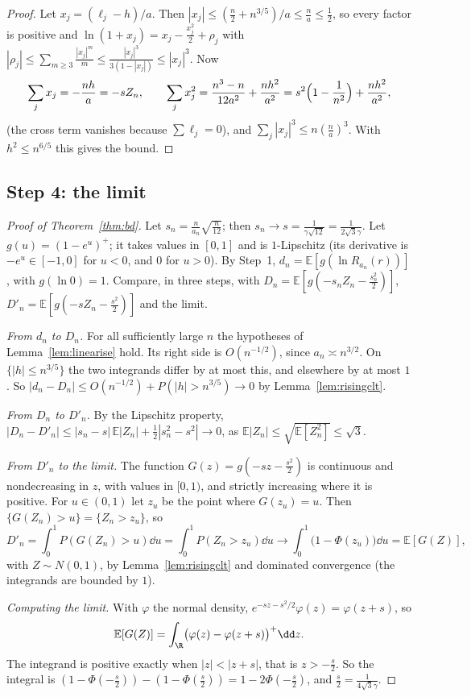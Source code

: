 \begin{proof}
Let $x_j=(\ell_j-h)/a$. Then $|x_j|\le(\frac n2+n^{3/5})/a\le\frac na\le\frac12$, so every factor is positive and $\ln(1+x_j)=x_j-\frac{x_j^2}2+\rho_j$ with
$|\rho_j|\le\sum_{m\ge3}\frac{|x_j|^m}m\le\frac{|x_j|^3}{3(1-|x_j|)}\le|x_j|^3$. Now
\[
\sum_jx_j=-\frac{nh}a=-sZ_n,\qquad\sum_jx_j^2=\frac{n^3-n}{12a^2}+\frac{nh^2}{a^2}=s^2\Bigl(1-\frac1{n^2}\Bigr)+\frac{nh^2}{a^2},
\]
(the cross term vanishes because $\sum\ell_j=0$), and $\sum_j|x_j|^3\le n(\frac na)^3$. With $h^2\le n^{6/5}$ this gives the bound.
\end{proof}

\subsection*{Step 4: the limit}

\begin{proof}[Proof of Theorem~\ref{thm:bd}]
Let $s_n=\frac n{a_n}\sqrt{\frac n{12}}$; then $s_n\to s=\frac1{\gamma\sqrt{12}}=\frac1{2\sqrt3\gamma}$. Let $g(u)=(1-e^u)^+$; it takes values in $[0,1]$ and is $1$-Lipschitz (its derivative is $-e^u\in[-1,0]$ for $u<0$,
and $0$ for $u>0$). By Step~1, $d_n=\mathbb E[g(\ln R_{a_n}(r))]$, with $g(\ln0)=1$. Compare, in three steps, with $D_n=\mathbb E[g(-s_nZ_n-\frac{s_n^2}2)]$, $D'_n=\mathbb E[g(-sZ_n-\frac{s^2}2)]$ and the
limit.

\emph{From $d_n$ to $D_n$.} For all sufficiently large $n$ the hypotheses of Lemma~\ref{lem:linearise} hold. Its right side is $O(n^{-1/2})$, since $a_n\asymp n^{3/2}$. On $\{|h|\le n^{3/5}\}$ the two integrands differ by at most this, and
elsewhere by at most $1$. So $|d_n-D_n|\le O(n^{-1/2})+P(|h|>n^{3/5})\to0$ by Lemma~\ref{lem:risingclt}.

\emph{From $D_n$ to $D'_n$.} By the Lipschitz property, $|D_n-D'_n|\le|s_n-s|\,\mathbb E|Z_n|+\frac12|s_n^2-s^2|\to0$, as $\mathbb E|Z_n|\le\sqrt{\mathbb E[Z_n^2]}\le\sqrt3$.

\emph{From $D'_n$ to the limit.} The function $G(z)=g(-sz-\frac{s^2}2)$ is continuous and nondecreasing in $z$, with values in $[0,1)$, and strictly increasing where it is positive.
For $u\in(0,1)$ let $z_u$ be the point where $G(z_u)=u$. Then $\{G(Z_n)>u\}=\{Z_n>z_u\}$, so
\[
D'_n=\int_0^1P(G(Z_n)>u)\dd u=\int_0^1P(Z_n>z_u)\dd u\longrightarrow\int_0^1\bigl(1-\Phi(z_u)\bigr)\dd u=\mathbb E[G(Z)],
\]
with $Z\sim N(0,1)$, by Lemma~\ref{lem:risingclt} and dominated convergence (the integrands are bounded by $1$).

\emph{Computing the limit.} With $\varphi$ the normal density, $e^{-sz-s^2/2}\varphi(z)=\varphi(z+s)$, so
\[
\mathbb E[G(Z)]=\int_\R\bigl(\varphi(z)-\varphi(z+s)\bigr)^+\dd z.
\]
The integrand is positive exactly when $|z|<|z+s|$, that is $z>-\frac s2$. So the integral is $(1-\Phi(-\frac s2))-(1-\Phi(\frac s2))=1-2\Phi(-\frac s2)$, and $\frac s2=\frac1{4\sqrt3\gamma}$.
\end{proof}


